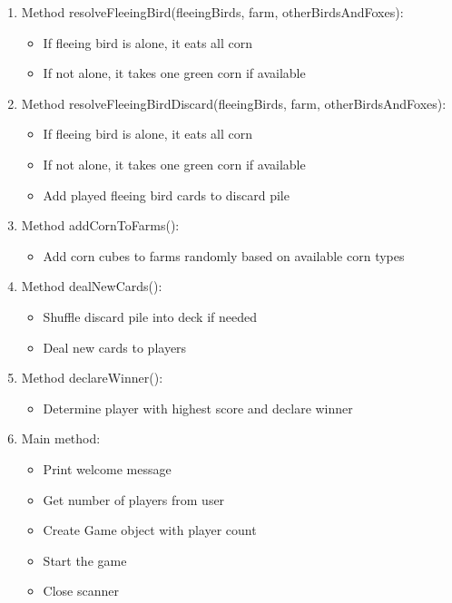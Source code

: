 \documentclass[conference]{IEEEtran}
\begin{document}
\begin{enumerate}
    \item Method resolveFleeingBird(fleeingBirds, farm, otherBirdsAndFoxes):
    \begin{itemize}
        \item If fleeing bird is alone, it eats all corn
        \item If not alone, it takes one green corn if available
    \end{itemize}

    \item Method resolveFleeingBirdDiscard(fleeingBirds, farm, otherBirdsAndFoxes):
    \begin{itemize}
        \item If fleeing bird is alone, it eats all corn
        \item If not alone, it takes one green corn if available
        \item Add played fleeing bird cards to discard pile
    \end{itemize}

    \item Method addCornToFarms():
    \begin{itemize}
        \item Add corn cubes to farms randomly based on available corn types
    \end{itemize}

    \item Method dealNewCards():
    \begin{itemize}
        \item Shuffle discard pile into deck if needed
        \item Deal new cards to players
    \end{itemize}

    \item Method declareWinner():
    \begin{itemize}
        \item Determine player with highest score and declare winner
    \end{itemize}

    \item Main method:
    \begin{itemize}
        \item Print welcome message
        \item Get number of players from user
        \item Create Game object with player count
        \item Start the game
        \item Close scanner
    \end{itemize}
\end{enumerate}
\end{document}

